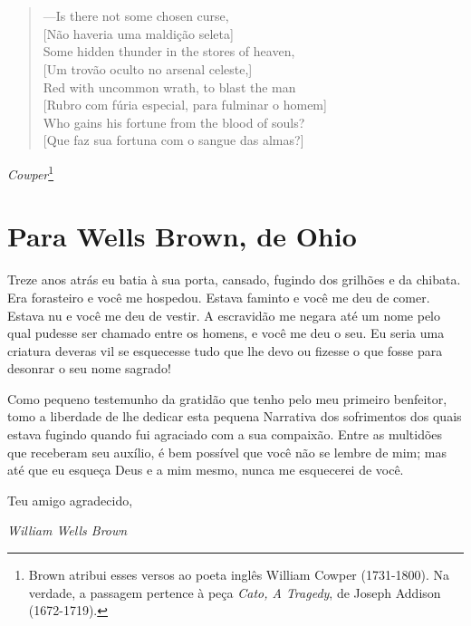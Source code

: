 \chapter*{}
\thispagestyle{empty}
\begin{verse}
---Is there not some chosen curse,\\
{[}Não haveria uma maldição seleta{]}\\
Some hidden thunder in the stores of heaven,\\
{[}Um trovão oculto no arsenal celeste,{]}\\
Red with uncommon wrath, to blast the man\\
{[}Rubro com fúria especial, para fulminar o \qb{}homem{]}\\
Who gains his fortune from the blood of \qb{}souls?\\
{[}Que faz sua fortuna com o sangue das \qb{}almas?{]}
\end{verse}
\begin{flushright}
\emph{Cowper}\footnote{Brown atribui esses versos ao poeta inglês William
  Cowper (1731-1800). Na verdade, a passagem pertence à peça \emph{Cato,
  A Tragedy}, de Joseph Addison (1672-1719).}
\end{flushright}

\chapter{Para Wells Brown, de Ohio}

Treze anos atrás eu batia à sua porta, cansado, fugindo dos grilhões e
da chibata. Era forasteiro e você me hospedou. Estava faminto e você me
deu de comer. Estava nu e você me deu de vestir. A escravidão me negara
até um nome pelo qual pudesse ser chamado entre os homens, e você me deu
o seu. Eu seria uma criatura deveras vil se esquecesse tudo que lhe devo
ou fizesse o que fosse para desonrar o seu nome sagrado!

Como pequeno testemunho da gratidão que tenho pelo meu primeiro
benfeitor, tomo a liberdade de lhe dedicar esta pequena Narrativa dos
sofrimentos dos quais estava fugindo quando fui agraciado com a sua
compaixão. Entre as multidões que receberam seu auxílio, é bem possível
que você não se lembre de mim; mas até que eu esqueça Deus e a mim
mesmo, nunca me esquecerei de você.

Teu amigo agradecido,

\begin{flushright}
\emph{William Wells Brown}
\end{flushright}

